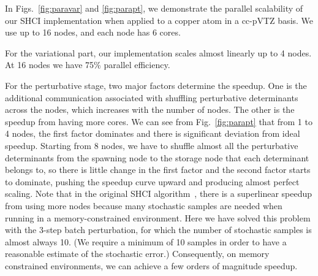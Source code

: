 \documentclass[%
reprint,
 superscriptaddress,
 amsmath,amssymb,
 aps,
]{revtex4-1}
\begin{document}
In Figs.~\ref{fig:paravar} and \ref{fig:parapt}, we demonstrate the parallel scalability of our SHCI implementation
when applied to a copper atom in a cc-pVTZ basis. We use up to 16 nodes, and each node has 6 cores.

For the variational part, our implementation scales almost linearly up to 4 nodes.
At 16 nodes we have 75\% parallel efficiency.

For the perturbative stage, two major factors determine the speedup.
One is the additional communication associated with
shuffling perturbative determinants across the nodes, which increases with the number of nodes.
The other is the speedup from having more cores.
We can see from Fig.~\ref{fig:parapt} that from 1 to 4 nodes, the first factor dominates and there is significant deviation from ideal speedup.
Starting from 8 nodes, we have to shuffle almost all the perturbative determinants from the spawning node to the storage node that each determinant belongs to,
so there is little change in the first factor and the second factor starts to dominate, pushing the speedup curve upward and producing almost perfect scaling.
Note that in the original SHCI algorithm~\cite{ShaHolJeaAlaUmr-JCTC-17}, there is a superlinear speedup from using more nodes
because many stochastic samples are needed when running in a memory-constrained environment.
Here we have solved this problem with the 3-step batch perturbation, for which the number of stochastic samples
is almost always 10.  (We require a minimum of 10 samples in order to have a reasonable estimate of the stochastic error.)
Consequently, 
on memory constrained environments,
we can achieve a few orders of magnitude speedup.
\end{document}
